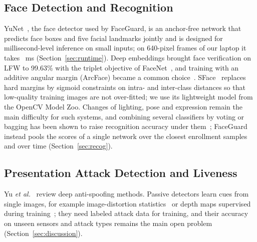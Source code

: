 \documentclass[journal]{IEEEtran}
\newcommand{\sys}{FaceGuard}
\begin{document}
\subsection{Face Detection and Recognition}
YuNet~\cite{wu2023yunet}, the face detector used by \sys{}, is an anchor-free network that predicts face boxes and five facial landmarks jointly and is designed for millisecond-level inference on small inputs; on 640-pixel frames of our laptop it takes \rtDet~ms (Section~\ref{sec:runtime}). Deep embeddings brought face verification on LFW to 99.63\% with the triplet objective of FaceNet~\cite{schroff2015facenet}, and training with an additive angular margin (ArcFace) became a common choice~\cite{deng2019arcface}. SFace~\cite{zhong2021sface} replaces hard margins by sigmoid constraints on intra- and inter-class distances so that low-quality training images are not over-fitted; we use its lightweight model from the OpenCV Model Zoo. Changes of lighting, pose and expression remain the main difficulty for such systems, and combining several classifiers by voting or bagging has been shown to raise recognition accuracy under them~\cite{gupta2024ensemble}; \sys{} instead pools the scores of a single network over the closest enrollment samples and over time (Section~\ref{sec:recog}).

\subsection{Presentation Attack Detection and Liveness}
Yu \emph{et al.}~\cite{yu2023fassurvey} review deep anti-spoofing methods. Passive detectors learn cues from single images, for example image-distortion statistics~\cite{wen2015ida} or depth maps supervised during training~\cite{liu2018auxiliary}; they need labeled attack data for training, and their accuracy on unseen sensors and attack types remains the main open problem (Section~\ref{sec:discussion}).
\end{document}
